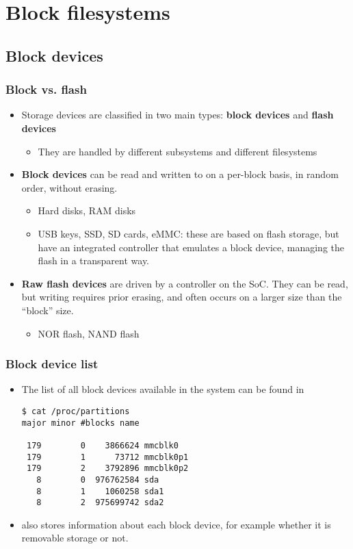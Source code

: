 \section{Block filesystems}

\subsection{Block devices}

\begin{frame}
  \frametitle{Block vs. flash}
  \begin{itemize}
  \item Storage devices are classified in two main types: {\bf block
      devices} and {\bf flash devices}
    \begin{itemize}
    \item They are handled by different subsystems and different
      filesystems
    \end{itemize}
  \item {\bf Block devices} can be read and written to on a per-block
    basis, in random order, without erasing.
    \begin{itemize}
    \item Hard disks, RAM disks
    \item USB keys, SSD, SD cards, eMMC: these are based
      on flash storage, but have an integrated controller that
      emulates a block device, managing the flash in a transparent
      way.
    \end{itemize}
  \item {\bf Raw flash devices} are driven by a controller on the
      SoC. They can be read, but writing requires prior erasing,
      and often occurs on a larger size than the “block” size.
    \begin{itemize}
    \item NOR flash, NAND flash
    \end{itemize}
  \end{itemize}
\end{frame}

\begin{frame}[fragile]
  \frametitle{Block device list}
  \begin{itemize}
  \item The list of all block devices available in the system can be
    found in \\
\begin{verbatim}
$ cat /proc/partitions
major minor #blocks name

 179        0    3866624 mmcblk0
 179        1      73712 mmcblk0p1
 179        2    3792896 mmcblk0p2
   8        0  976762584 sda
   8        1    1060258 sda1
   8        2  975699742 sda2
\end{verbatim}
  \item {} also stores information about each block device,
     for example whether it is removable storage or not.
  \end{itemize}
\end{frame}

